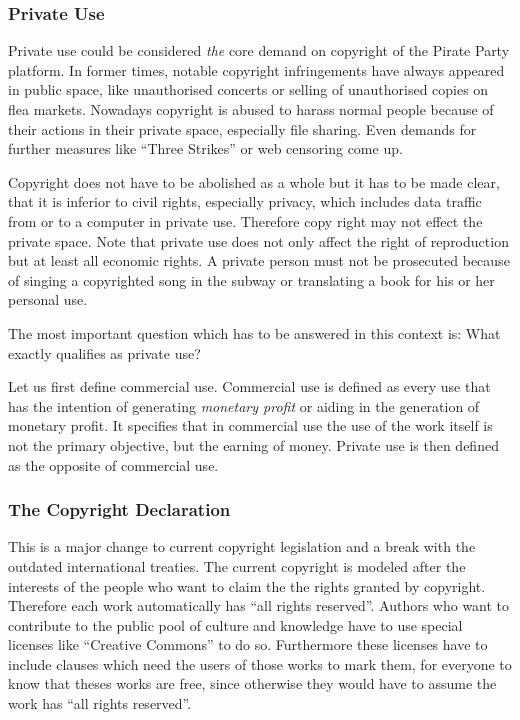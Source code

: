 \subsubsection{Private Use}

Private use could be considered \textit{the} core demand on copyright of the Pirate Party platform. In former times, notable copyright infringements have always appeared in public space, like unauthorised concerts or selling of unauthorised copies on flea markets. Nowadays copyright is abused to harass normal people because of their actions in their private space, especially file sharing. Even demands for further measures like ``Three Strikes'' or web censoring come up.

Copyright does not have to be abolished as a whole but it has to be made clear, that it is inferior to civil rights, especially privacy, which includes data traffic from or to a computer in private use. Therefore copy right may not effect the private space. Note that private use does not only affect the right of reproduction but at least all economic rights. A private person must not be prosecuted because of singing a copyrighted song in the subway or translating a book for his or her personal use. 

The most important question which has to be answered in this context is: What exactly qualifies as private use? 

Let us first define commercial use. Commercial use is defined as every use that has the intention of generating \textit{monetary profit} or aiding in the generation of monetary profit. It specifies that in commercial use the use of the work itself is not the primary objective, but the earning of money. Private use is then defined as the opposite of commercial use.

\subsubsection{The Copyright Declaration}

This is a major change to current copyright legislation and a break with the outdated international treaties. The current copyright is modeled after the interests of the people who want to claim the the rights granted by copyright. Therefore each work automatically has ``all rights reserved''. Authors who want to contribute to the public pool of culture and knowledge have to use special licenses like ``Creative Commons'' to do so. Furthermore these licenses have to include clauses which need the users of those works to mark them, for everyone to know that theses works are free, since otherwise they would have to assume the work has ``all rights reserved''. 

